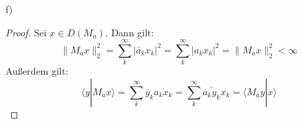 \documentclass[a4paper,12pt]{article}
\newcommand{\brak}{}
\begin{document}
f)
\begin{proof}
Sei $x\in D(M_a)$. Dann gilt:
$$\|M_{\overline{a}}x\|_2^2=\sum_k^\infty |\overline{a}_kx_k|^2=\sum_k^\infty |a_kx_k|^2=\|M_ax\|_2^2<\infty$$
Außerdem gilt:
$$\brak\langle {y}| {M_a x}\rangle=\sum_k^\infty \overline{y}_ka_kx_k=\sum_k^\infty \overline{\overline{a}_ky_k}x_k=\brak\langle {M_{\overline{a}}y}| {x}\rangle$$
\end{proof}
\end{document}

